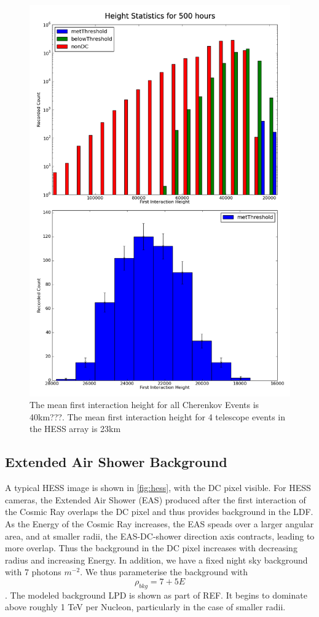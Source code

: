 \documentclass{article}
\begin{document}
\begin{figure}
\begin{center}
\includegraphics[height=0.9\textheight]{hessheight}
\caption{The mean first interaction height for all Cherenkov Events is 40km???. The mean first interaction height for 4 telescope events in the HESS array is 23km}
\label{fig:Hessheight}
\end{center}
\end{figure}

\subsection{Extended Air Shower Background}
A typical HESS image is shown in \ref{fig:hess}, with the DC pixel visible. For HESS cameras, the Extended Air Shower (EAS) produced after the first interaction of the Cosmic Ray overlaps the DC pixel and thus provides background in the LDF. As the Energy of the Cosmic Ray increases, the EAS speads over a larger angular area, and at smaller radii, the EAS-DC-shower direction axis contracts, leading to more overlap. Thus the background in the DC pixel increases with decreasing radius and increasing Energy. In addition, we have a fixed night sky background with 7 photons $m^{-2}$. We thus parameterise the background with \[ \rho_{bkg}  = 7 + 5E\]. The modeled background LPD is shown as part of REF. It begins to dominate above roughly 1 TeV per Nucleon, particularly in the case of smaller radii. 
\end{document}
